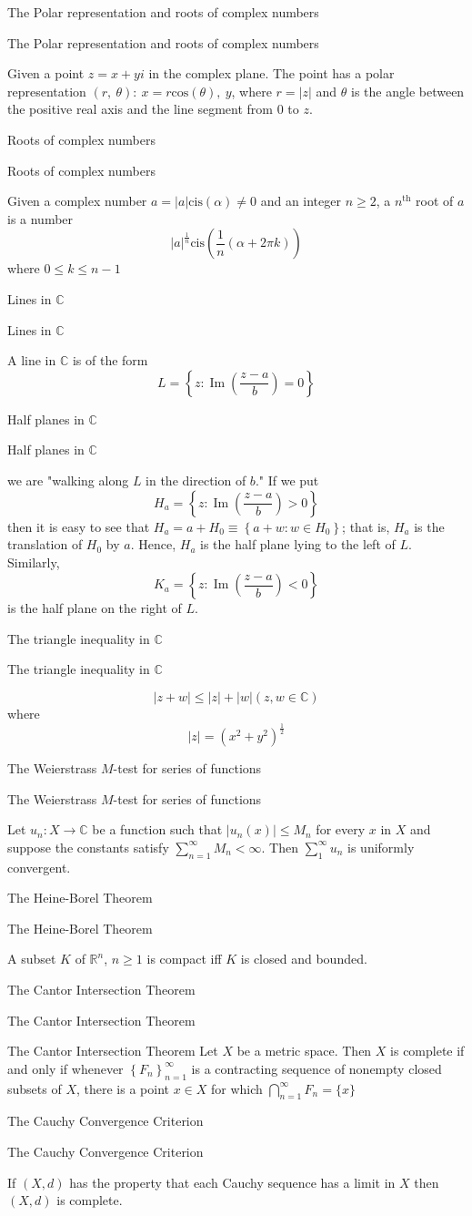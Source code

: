\documentclass[17pt]{extarticle}
\newcommand{\R}{\mathbb{R}}
\newcommand{\C}{\mathbb{C}}
\renewcommand{\cos}[1]{\text{cos}\left(#1\right)}
\newcommand{\boxset}[2]{\begin{mdframed}[style=darkQuesion]
  #1
    \end{mdframed}
    \newpage
    \begin{mdframed}[style=darkQuesion]
      #1
        \end{mdframed}
    \begin{mdframed}[style=darkAnswer]
      #2
        \end{mdframed}
        \newpage
  }
\begin{document}
\par
\newpage
\boxset{The Polar representation and roots of complex numbers}
{Given a point $z=x+yi$ in the complex plane. The point has a polar
representation $\left( r,\ \theta\right):\ x=r\cos{\theta},\ y$, where $r=\left|z\right|$
and $\theta$ is the angle between the positive real axis and the line
segment from $0$ to $z$.}
\boxset{Roots of complex numbers}
{Given a complex number $a=\left|a\right|\text{cis}\left(\alpha\right)\neq 0$ and an integer
$n\geq 2$, a $n^{\text{th}}$
root of $a$ is a number
\[\left|a\right|^{\frac{1}{n}}\text{cis}\left( \frac{1}{n}\left( \alpha+2\pi k\right)\right)\]
where $0\leq k \leq n-1$
}
\boxset{Lines in $\mathbb{C}$}
{A line in $\C$ is of the form
\[L=\left\{z: \operatorname{Im}\left(\frac{z-a}{b}\right)=0\right\}\]
}
\boxset{Half planes in $\mathbb{C}$}
{we are "walking along $L$ in the direction of $b$." If we put
\[H_{a}=\left\{z: \operatorname{Im}\left(\frac{z-a}{b}\right)>0\right\}\]
then it is easy to see that $H_{a}=a+H_{0} \equiv\left\{a+w: w \in H_{0}\right\}$; that is, $H_{a}$ is the translation of $H_{0}$ by $a$. Hence, $H_{a}$ is the half plane lying to the left of $L$. Similarly,
\[K_{a}=\left\{z: \operatorname{Im}\left(\frac{z-a}{b}\right)<0\right\}\]
is the half plane on the right of $L$.}
\boxset{The triangle inequality in $\mathbb{C}$}
{\[|z+w| \leq|z|+|w|(z, w \in \mathbb{C})\]
where
\[|z|=\left(x^{2}+y^{2}\right)^{\frac{1}{2}}\]
}
\boxset{The Weierstrass $M$-test for series of functions}
{
 Let $u_{n}: X \rightarrow \mathbb{C}$ be a function such that $\left|u_{n}(x)\right| \leq M_{n}$ for every $x$ in $X$ and suppose the constants satisfy $\sum_{n=1}^{\infty} M_{n}<\infty$. Then $\sum_{1}^{\infty} u_{n}$ is uniformly convergent.
}
\boxset{The Heine-Borel Theorem}
{A subset $K$ of $\R^n$, $n\geq 1$ is compact iff $K$ is closed and bounded.}
\boxset{The Cantor Intersection Theorem}
{The Cantor Intersection Theorem Let $X$ be a metric space. Then $X$ is complete if and only if whenever $\left\{F_{n}\right\}_{n=1}^{\infty}$ is a contracting sequence of nonempty closed subsets of $X$, there is a point $x \in X$ for which $\bigcap_{n=1}^{\infty} F_{n}=\{x\}$}
\boxset{The Cauchy Convergence Criterion}
{If $(X, d)$ has the property that each Cauchy sequence has a limit in $X$ then $(X, d)$ is complete.}
\end{document}
